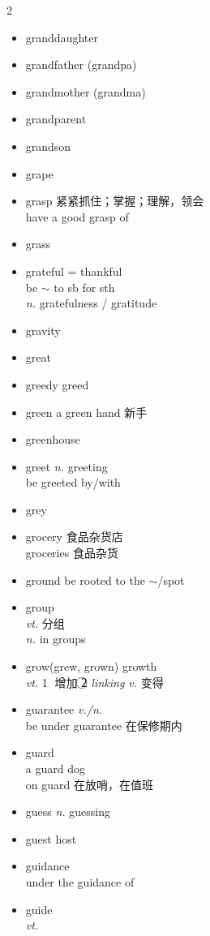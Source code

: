 \documentclass[../../book.tex]{subfiles}
\begin{document}
\begin{multicols}{2}
\begin{itemize}
\item[-] granddaughter
\item[-] grandfather (grandpa)
\item[-] grandmother (grandma)
\item[-] grandparent
\item[-] grandson
\item[-] grape
\item[-] grasp 紧紧抓住；掌握；理解，领会
\\have a good grasp of
\item[-] grass
\item[-] grateful = thankful
\\be $\sim$ to sb for sth
\\\emph{n.} gratefulness / gratitude
\item[-] gravity
\item[-] great
\item[-] greedy \phantom{a} greed
\item[-] green \phantom{a} a green hand 新手
\item[-] greenhouse
\item[-] greet \phantom{a} \emph{n.} greeting
\\be greeted by/with
\item[-] grey
\item[-] grocery 食品杂货店
\\groceries 食品杂货
\item[-] ground \phantom{a} be rooted to the $\sim$/spot
\item[-] group
\\\emph{vt.} 分组
\\\emph{n.} in groups
\item[-] grow(grew, grown) \phantom{a} growth
\\\emph{vt.} \textcircled{1} 增加 \textcircled{2} \emph{linking v.} 变得
\item[-] guarantee \emph{v./n.}
\\be under guarantee 在保修期内
\item[-] guard
\\a guard dog
\\on guard 在放哨，在值班
\item[-] guess \phantom{a} \emph{n.} guessing
\item[-] guest \phantom{a} host
\item[-] guidance
\\under the guidance of
\item[-] guide
\\\emph{vt.}

\end{itemize}
\end{multicols}
\end{document}
